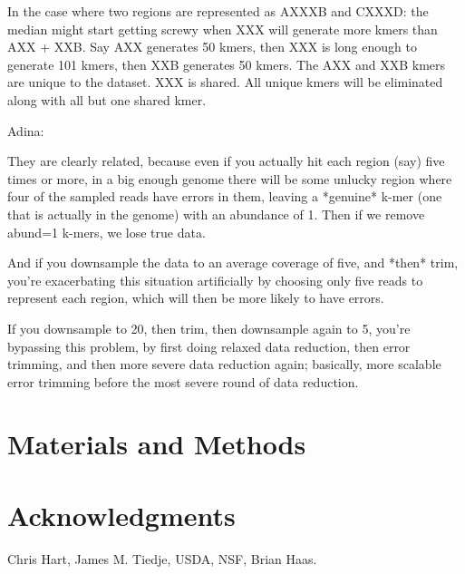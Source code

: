 \documentclass[10pt]{article}
\begin{document}
In the case where two regions are represented as AXXXB and CXXXD: the
median might start getting screwy when XXX will generate more kmers
than AXX + XXB.  Say AXX generates 50 kmers, then XXX is long enough
to generate 101 kmers, then XXB generates 50 kmers.  The AXX and XXB
kmers are unique to the dataset.  XXX is shared.  All unique kmers
will be eliminated along with all but one shared kmer.

Adina:

They are clearly related, because even if you actually hit each region
(say) five times or more, in a big enough genome there will be some
unlucky region where four of the sampled reads have errors in them,
leaving a *genuine* k-mer (one that is actually in the genome) with an
abundance of 1. Then if we remove abund=1 k-mers, we lose true data.

And if you downsample the data to an average coverage of five, and
*then* trim, you're exacerbating this situation artificially by
choosing only five reads to represent each region, which will then be
more likely to have errors.

If you downsample to 20, then trim, then
downsample again to 5, you're bypassing this problem, by first doing
relaxed data reduction, then error trimming, and then more severe data
reduction again; basically, more scalable error trimming before the
most severe round of data reduction.

\section*{Materials and Methods}

\section*{Acknowledgments}

Chris Hart, James M. Tiedje, USDA, NSF, Brian Haas.



\newpage
\end{document}
